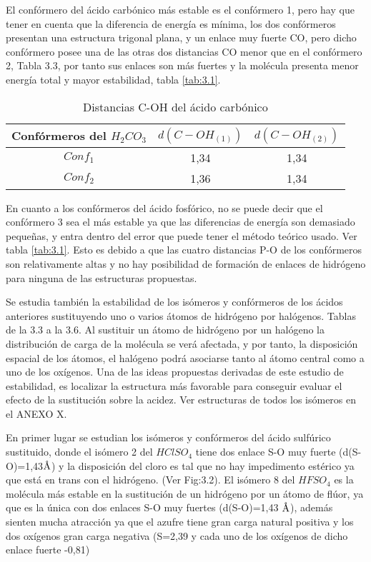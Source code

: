 El confórmero del ácido carbónico más estable es el confórmero 1, pero hay que tener en cuenta que la diferencia de energía es mínima, los dos confórmeros presentan una estructura trigonal plana, y un enlace muy fuerte CO, pero dicho confórmero posee una de las otras dos distancias CO menor que en el confórmero 2, Tabla 3.3, por tanto sus enlaces son más fuertes y la molécula presenta menor energía total y mayor estabilidad, tabla \ref{tab:3.1}. 
\begin{table}[H]
    \centering
    \begin{tabular}{|c|c|c|}
    \hline
    Confórmeros del $H_2CO_3$ & $d(C-OH_{(1)})$ & $d(C-OH_{(2)})$ \\ \hline
    $Conf_1$ & 1,34 & 1,34  \\ \hline
    $Conf_2$ & 1,36 & 1,34 \\ \hline 
    \end{tabular}
    \caption{Distancias C-OH del ácido carbónico}
\end{table}

En cuanto a los confórmeros del ácido fosfórico, no se puede decir que el confórmero 3 sea el más estable ya que las diferencias de energía son demasiado pequeñas, y entra dentro del error que puede tener el método teórico usado. Ver tabla \ref{tab:3.1}. Esto es debido a que las cuatro distancias P-O de los confórmeros son relativamente altas y no hay posibilidad de formación de enlaces de hidrógeno para ninguna de las estructuras propuestas.

Se estudia también la estabilidad de los isómeros y confórmeros de los ácidos anteriores sustituyendo uno o varios átomos de hidrógeno por halógenos. Tablas de la 3.3 a la 3.6. Al sustituir un átomo de hidrógeno por un halógeno la distribución de carga de la molécula se verá afectada, y por tanto, la disposición espacial de los átomos, el halógeno podrá asociarse tanto al átomo central como a uno de los oxígenos. Una de las ideas propuestas derivadas de este estudio de  estabilidad, es localizar la estructura más favorable para conseguir evaluar el efecto de la sustitución sobre la acidez. Ver estructuras de todos los isómeros en el ANEXO X.

En primer lugar se estudian los isómeros y confórmeros del ácido sulfúrico sustituido, donde el isómero 2 del $HClSO_4$ tiene dos enlace S-O muy fuerte (d(S-O)=1,43$\mbox{\normalfont\AA}$) y la disposición del cloro es tal que no hay impedimento estérico ya que está en trans con el hidrógeno. (Ver Fig:3.2). El isómero 8 del $HFSO_4$ es la molécula más estable en la sustitución de un hidrógeno por un átomo de flúor, ya que es la única con dos enlaces S-O muy fuertes (d(S-O)=1,43 $\mbox{\normalfont\AA}$), además sienten mucha atracción ya que el azufre tiene gran carga natural positiva y los dos oxígenos gran carga negativa (S=2,39 y cada uno de los oxígenos de dicho enlace fuerte -0,81)

